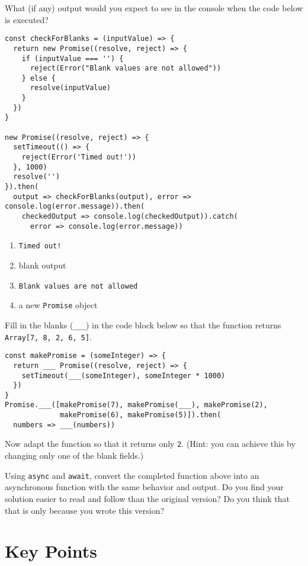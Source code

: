 
What (if any) output would you expect to see in the console
when the code below is executed?

\begin{verbatim}
const checkForBlanks = (inputValue) => {
  return new Promise((resolve, reject) => {
    if (inputValue === '') {
      reject(Error("Blank values are not allowed"))
    } else {
      resolve(inputValue)
    }
  })
}

new Promise((resolve, reject) => {
  setTimeout(() => {
    reject(Error('Timed out!'))
  }, 1000)
  resolve('')
}).then(
  output => checkForBlanks(output), error => console.log(error.message)).then(
    checkedOutput => console.log(checkedOutput)).catch(
      error => console.log(error.message))
\end{verbatim}

\begin{enumerate}
\item
  \texttt{Timed\ out!}
\item
  blank output
\item
  \texttt{Blank\ values\ are\ not\ allowed}
\item
  a new \texttt{Promise} object
\end{enumerate}


Fill in the blanks (\texttt{\_\_\_}) in the code block below so that
the function returns \texttt{Array[7,\ 8,\ 2,\ 6,\ 5]}.

\begin{verbatim}
const makePromise = (someInteger) => {
  return ___ Promise((resolve, reject) => {
    setTimeout(___(someInteger), someInteger * 1000)
  })
}
Promise.___([makePromise(7), makePromise(___), makePromise(2),
             makePromise(6), makePromise(5)]).then(
  numbers => ___(numbers))
\end{verbatim}

\noindent
Now adapt the function so that it returns only \texttt{2}.
(Hint: you can achieve this by changing only one of the blank fields.)


Using \texttt{async} and \texttt{await},
convert the completed function above into an asynchronous function with the same behavior and output.
Do you find your solution easier to read and follow than the original version?
Do you think that that is only because you wrote this version?

\section*{Key Points}


